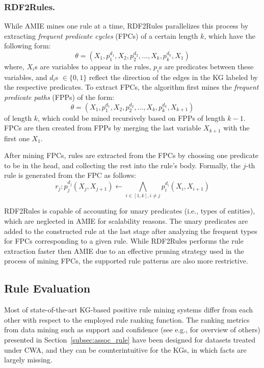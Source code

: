 \subsubsection{RDF2Rules.}
While AMIE mines one rule at a time, RDF2Rules \cite{rdf2rules} parallelizes this process by extracting \emph{frequent predicate cycles} (FPCs) of %
a certain length $k$, which have the following form:
\[\theta = (X_1, p_1^{d_1}, X_2, p_2^{d_2},\dotsc, X_k, p_k^{d_k}, X_1)\]
where, $X_i$s are variables to appear in the rules, $p_i$s are predicates between these variables, and $d_i$s $\in \{0,1\}$ reflect the direction of the edges in the KG labeled by the respective predicates. To extract FPCs, the algorithm first mines the \emph{frequent predicate paths} (FPPs) of the form:
\[\theta = (X_1, p_1^{d_1}, X_2, p_2^{d_2}, ...,X_k, p_k^{d_k}, X_{k+1})\]
of length $k$, which could be mined recursively based on FPPs of length $k-1$. 
FPCs are then created from FPPs by merging the last variable $X_{k+1}$ with the first one $X_1$.

After mining FPCs, rules are extracted from the FPCs by choosing one %
predicate to be in    %
the head, and collecting the rest into the rule's  body. 
Formally, the  $j$-th rule is generated from the FPC as follows:
\[r_j: p_j^{d_j}(X_j,X_{j+1}) \leftarrow \underset{i \in [1,k], i \ne j}{\bigwedge} p_i^{d_i}(X_i,X_{i+1}) \]

RDF2Rules is capable of accounting for unary predicates (i.e., types of entities), which are neglected in AMIE for scalability reasons. %
The unary predicates are added to the constructed rule at the last stage after analyzing the 
frequent types for FPCs corresponding to a given rule.
While RDF2Rules performs the rule extraction faster then AMIE due to an effective pruning strategy
used in the process of mining FPCs, the supported rule patterns are also more restrictive. 

\subsection{Rule Evaluation}
Most of state-of-the-art KG-based positive rule mining systems %
differ from each other with respect to the employed %
rule ranking function. %
The ranking metrics from data mining such as support and confidence (see e.g., \cite{metrics-summary} for overview of others) presented in Section~\ref{subsec:assoc_rule} have been designed for datasets treated under CWA, and they can be counterintuitive for the KGs, in which facts are largely missing.

